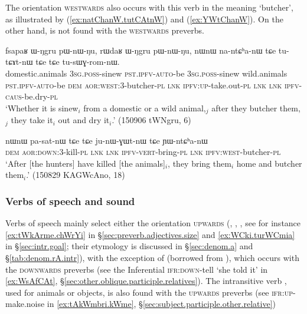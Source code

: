 The orientation \textsc{westwards} also occurs with this verb in the meaning `butcher', as illustrated by (\ref{ex:natChanW.tutCAtnW}) and (\ref{ex:YWtChanW}). On the other hand,  is not found with the \textsc{westwards} preverbs.

\begin{exe}
\ex \label{ex:natChanW.tutCAtnW}
\gll fsapaʁ ɯ-ŋgru pɯ-nɯ-ŋu, rɯdaʁ ɯ-ŋgru pɯ-nɯ-ŋu,  nɯnɯ na-ntɕʰa-nɯ tɕe tu-tɕɤt-nɯ tɕe tɕe tu-sɯɣ-rom-nɯ. \\
domestic.animals \textsc{3sg}.\textsc{poss}-sinew  \textsc{pst}.\textsc{ipfv}-\textsc{auto}-be  \textsc{3sg}.\textsc{poss}-sinew  wild.animals \textsc{pst}.\textsc{ipfv}-\textsc{auto}-be \textsc{dem} \textsc{aor}:\textsc{west}:3\flobv{}-butcher-\textsc{pl} \textsc{lnk} \textsc{ipfv}:\textsc{up}-take.out-\textsc{pl} \textsc{lnk} \textsc{lnk} \textsc{ipfv}-\textsc{caus}-be.dry-\textsc{pl} \\
\glt `Whether it is sinew$_i$ from a domestic or a wild animal,$_j$  after they butcher them,$_j$ they take it$_i$ out and dry it$_i$.' (150906 tWNgru, 6)
\end{exe} 

\begin{exe}
\ex \label{ex:YWtChanW}
\gll nɯnɯ pa-sat-nɯ tɕe tɕe ju-nɯ-ɣɯt-nɯ tɕe ɲɯ-ntɕʰa-nɯ  \\
\textsc{dem} \textsc{aor}:\textsc{down}:3\flobv{}-kill-\textsc{pl} \textsc{lnk} \textsc{lnk} \textsc{ipfv}-\textsc{vert}-bring-\textsc{pl} \textsc{lnk} \textsc{ipfv}:\textsc{west}-butcher-\textsc{pl} \\
\glt `After [the hunters] have killed [the animals]$_i$, they bring them$_i$ home and butcher them$_i$.' (150829 KAGWcAno, 18)
\end{exe} 

\subsubsection{Verbs of speech and sound}  \label{sec:preverb.speech}
Verbs of speech mainly select either the orientation \textsc{upwards} (, , , see for instance \ref{ex:tWkArme.chWrYi} in §\ref{sec:preverb.adjectives.size} and \ref{ex:WCki.turWCmia} in §\ref{sec:intr.goal}; their etymology is discussed in §\ref{sec:denom.a} and §\ref{tab:denom.rA.intr}), with the exception of  (borrowed from ), which occurs with the \textsc{downwards} preverbs (see the Inferential  \textsc{ifr}:\textsc{down}-tell `she told it' in \ref{ex:WsAfCAt}, §\ref{sec:other.oblique.participle.relatives}). The intransitive verb , used for animals or objects, is also found with the \textsc{upwards} preverbs (see  \textsc{ifr}:\textsc{up}-make.noise in \ref{ex:tAkWmbri.kWme}, §\ref{sec:subject.participle.other.relative})

